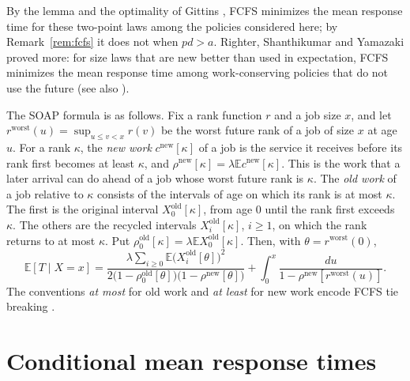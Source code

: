 \documentclass[11pt]{amsart}
\theoremstyle{remark}
\numberwithin{equation}{section}
\newcommand{\E}{\mathbb{E}}
\begin{document}
By the lemma and the optimality of Gittins \cite[Theorem~V.1]{SH21}, FCFS
minimizes the mean response time for these two-point laws among the
policies considered here; by Remark~\ref{rem:fcfs} it does not when
$pd>a$. Righter, Shanthikumar and Yamazaki
proved more: for size laws that are new better than used in expectation,
FCFS minimizes the mean response time among work-conserving policies
that do not use the future \cite{RSY90} (see also \cite[Section~1]{SHS20}).

The SOAP formula \cite[Theorem~5.5]{SHS18} is as follows. Fix a rank function $r$ and a job size $x$, and let
$r^{\mathrm{worst}}(u)=\sup_{u\le v<x}r(v)$ be the worst future rank of a
job of size $x$ at age $u$. For a rank $\kappa$, the \emph{new work}
$c^{\mathrm{new}}[\kappa]$ of a job is the service it receives before its
rank first becomes at least $\kappa$, and $\rho^{\mathrm{new}}[\kappa]
=\lambda\E c^{\mathrm{new}}[\kappa]$. This is the work that a later arrival
can do ahead of a job whose worst future rank is $\kappa$. The \emph{old
work} of a job relative to $\kappa$ consists of the intervals of age on
which its rank is at most $\kappa$. The first is the original interval
$X^{\mathrm{old}}_0[\kappa]$, from age $0$ until the rank first exceeds
$\kappa$. The others are the recycled intervals
$X^{\mathrm{old}}_i[\kappa]$, $i\ge1$, on which the rank returns to at
most $\kappa$. Put
$\rho^{\mathrm{old}}_0[\kappa]=\lambda\E X^{\mathrm{old}}_0[\kappa]$. Then,
with $\theta=r^{\mathrm{worst}}(0)$,
\begin{equation}\label{eq:soap}
\E[T\mid X=x]=\frac{\lambda\sum_{i\ge0}\E\bigl(X^{\mathrm{old}}_i[\theta]\bigr)^2}
{2\bigl(1-\rho^{\mathrm{old}}_0[\theta]\bigr)\bigl(1-\rho^{\mathrm{new}}[\theta]\bigr)}
+\int_0^x\frac{du}{1-\rho^{\mathrm{new}}[r^{\mathrm{worst}}(u)]}.
\end{equation}
The conventions \emph{at most} for old work and \emph{at least} for new
work encode FCFS tie breaking \cite[Section~4]{SHS18}.

\section{Conditional mean response times}\label{sec:means}
\end{document}
